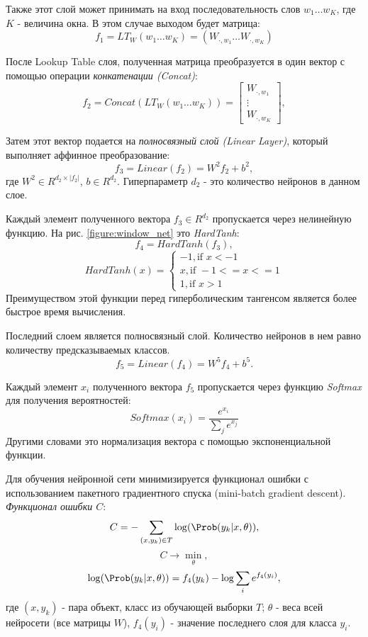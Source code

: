   Также этот слой может принимать на вход последовательность слов $w_1 \ldots w_K$,
  где $K$ - величина окна. В этом случае выходом будет матрица:
  \[
    f_1 = LT_W(w_1 \ldots w_K) = ( W_{\cdot, w_1} \ldots W_{\cdot, w_K})
  \]

  После Lookup Table слоя, полученная матрица преобразуется в один вектор с
  помощью операции \textit{конкатенации (Concat)}:
  \[
    f_{2} = Concat(LT_W(w_1 \ldots w_K)) =
      \begin{bmatrix}
        W_{\cdot, w_1} \\
        \vdots \\
        W_{\cdot, w_K}
      \end{bmatrix},
  \]

  Затем этот вектор подается на \textit{полносвязный слой (Linear Layer)}, который
  выполняет аффинное преобразование:
  \begin{equation} \label{formula:linear_layer}
    f_{3} = Linear(f_{2}) = W^2 f_{2} + b^2,
  \end{equation}
  где $W^2 \in R^{d_{2} \times |f_{2}|}$, $b \in R^{d_2}$. Гиперпараметр $d_{2}$ -
  это количество нейронов в данном слое.

  Каждый элемент полученного вектора $f_3 \in R^{d_2}$ пропускается через нелинейную функцию.
  На рис. \ref{figure:window_net} это \textit{HardTanh}:
  \[
    f_{4} = HardTanh(f_{3}),
  \]
  \begin{equation} \label{formula:hard_tanh}
  HardTanh(x) =
    \begin{cases}
      -1, \text{if } x < -1 \\
      x, \text{if } -1 <= x <= 1 \\
      1, \text{if } x > 1
    \end{cases}
  \end{equation}
  Преимуществом этой функции перед гиперболическим тангенсом является более быстрое
  время вычисления.

  Последний слоем является полносвязный слой. Количество нейронов в нем
  равно количеству предсказываемых классов.
  \[
    f_5 = Linear(f_4) = W^5 f_{4} + b^5.
  \]

  Каждый элемент $x_i$ полученного вектора $f_5$ пропускается через функцию \textit{Softmax} для получения
  вероятностей:
  \[
    Softmax(x_{i}) = \frac{e^{x_{i}}}{\sum_j e^{x_{j}}}
  \]
  Другими словами это нормализация вектора с помощью экспоненциальной функции.

  Для обучения нейронной сети минимизируется функционал ошибки с использованием
  пакетного градиентного спуска (mini-batch gradient descent).
  \textit{Функционал ошибки $C$}:
  \[
    C = - \sum_{(x, y_k) \in T} \log(\Prob(y_k | x, \theta)),
  \]
  \[
    C \rightarrow \min_\theta,
  \]
  \[
    \log(\Prob(y_k | x, \theta)) = f_4(y_k) - \log\sum_i e^{f_4(y_i)},
  \]
  где $(x, y_k)$ - пара объект, класс из обучающей выборки $T$; $\theta$ - веса
  всей нейросети (все матрицы $W$), $f_4(y_i)$ - значение последнего слоя для класса $y_i$.

